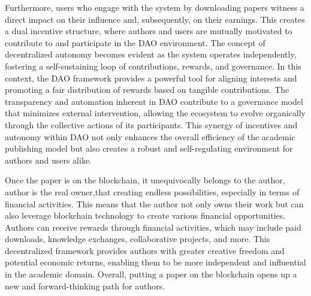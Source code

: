 \documentclass[lettersize,journal]{IEEEtran}
\begin{document}
Furthermore, users who engage with the system by downloading papers witness a direct impact on their influence and, subsequently, on their earnings. This creates a dual incentive structure, where authors and users are mutually motivated to contribute to and participate in the DAO environment. The concept of decentralized autonomy becomes evident as the system operates independently, fostering a self-sustaining loop of contributions, rewards, and governance.
In this context, the DAO framework provides a powerful tool for aligning interests and promoting a fair distribution of rewards based on tangible contributions. The transparency and automation inherent in DAO contribute to a governance model that minimizes external intervention, allowing the ecosystem to evolve organically through the collective actions of its participants. This synergy of incentives and autonomy within DAO not only enhances the overall efficiency of the academic publishing model but also creates a robust and self-regulating environment for authors and users alike.

Once the paper is on the blockchain, it unequivocally belongs to the author, author is the real owner,that creating endless possibilities, especially in terms of financial activities. This means that the author not only owns their work but can also leverage blockchain technology to create various financial opportunities. Authors can receive rewards through financial activities, which may include paid downloads, knowledge exchanges, collaborative projects, and more. This decentralized framework provides authors with greater creative freedom and potential economic returns, enabling them to be more independent and influential in the academic domain. Overall, putting a paper on the blockchain opens up a new and forward-thinking path for authors.
\end{document}

